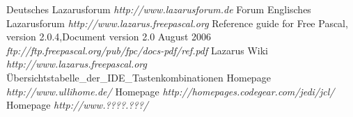 \begin{thebibliography}{99}
   Deutsches Lazarusforum \textsl{http://www.lazarusforum.de} Forum 
   Englisches Lazarusforum \textsl{http://www.lazarus.freepascal.org} 
   Reference guide for Free Pascal, version 2.0.4,Document version 2.0
August 2006 \textsl{ftp://ftp.freepascal.org/pub/fpc/docs-pdf/ref.pdf}  
   Lazarus Wiki \textsl{http://www.lazarus.freepascal.org}
  Übersichts\-tabelle\_der\_IDE\_Tasten\-kombinationen
   Homepage \textsl{http://www.ullihome.de/}
   Homepage \textsl{http://homepages.codegear.com/jedi/jcl/}
   Homepage \textsl{http://www.????.???/}
\end{thebibliography}
